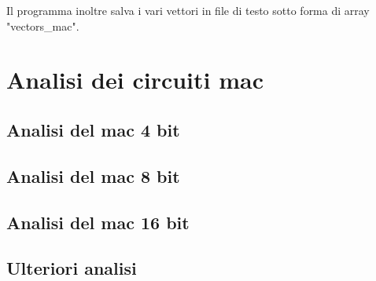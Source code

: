 \documentclass[12pt, letterpaper]{article}
\begin{document}
Il programma inoltre salva i vari vettori in file di testo sotto forma di array "vectors\_mac".

\section{Analisi dei circuiti mac}

\subsection{Analisi del mac 4 bit}

\subsection{Analisi del mac 8 bit}

\subsection{Analisi del mac 16 bit}

\subsection{Ulteriori analisi}
\end{document}
